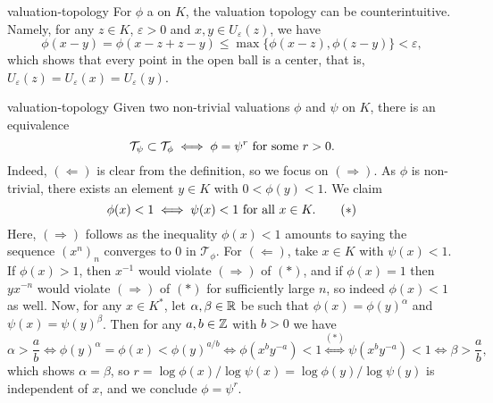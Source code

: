 \begin{example}{valuation-topology}
    For $\phi$ a  on $K$, the valuation topology can be counterintuitive. Namely, for any $z \in K$, $\varepsilon > 0$ and $x, y \in U_\varepsilon(z)$, we have
    \[ \phi(x - y) = \phi(x - z + z - y) \le \max \{ \phi(x - z), \phi(z - y) \} < \varepsilon , \]
    which shows that every point in the open ball is a center, that is, $U_\varepsilon(z) = U_\varepsilon(x) = U_\varepsilon(y)$.
\end{example}

\begin{example}{valuation-topology}
    Given two non-trivial valuations $\phi$ and $\psi$ on $K$, there is an equivalence
    \[ \mathcal{T}_\psi \subset \mathcal{T}_\phi \iff  \phi = \psi^r \textup{ for some } r > 0 . \]
    Indeed, $(\Leftarrow)$ is clear from the definition, so we focus on $(\Rightarrow)$.
    As $\phi$ is non-trivial, there exists an element $y \in K$ with $0 < \phi(y) < 1$. We claim
    \[ \phi(x) < 1 \iff \psi(x) < 1 \textup{ for all } x \in K . \tag{$*$} \]
    Here, $(\Rightarrow)$ follows as the inequality $\phi(x) < 1$ amounts to saying the sequence $(x^n)_n$ converges to $0$ in $\mathcal{T}_\phi$. For $(\Leftarrow)$, take $x \in K$ with $\psi(x) < 1$. If $\phi(x) > 1$, then $x^{-1}$ would violate $(\Rightarrow)$ of $(*)$, and if $\phi(x) = 1$ then $yx^{-n}$ would violate $(\Rightarrow)$ of $(*)$ for sufficiently large $n$, so indeed $\phi(x) < 1$ as well.
    Now, for any $x \in K^*$, let $\alpha, \beta \in \mathbb{R}$ be such that $\phi(x) = \phi(y)^\alpha$ and $\psi(x) = \psi(y)^\beta$. Then for any $a, b \in \mathbb{Z}$ with $b > 0$ we have
    \[ \alpha > \frac{a}{b} \iff \phi(y)^\alpha = \phi(x) < \phi(y)^{a/b} \iff \phi(x^b y^{-a}) < 1 \overset{(*)}{\iff} \psi(x^b y^{-a}) < 1 \iff \beta > \frac{a}{b} , \]
    which shows $\alpha = \beta$, so $r = \log \phi(x) / \log \psi(x) = \log \phi(y) / \log \psi(y)$ is independent of $x$, and we conclude $\phi = \psi^r$.
\end{example}
